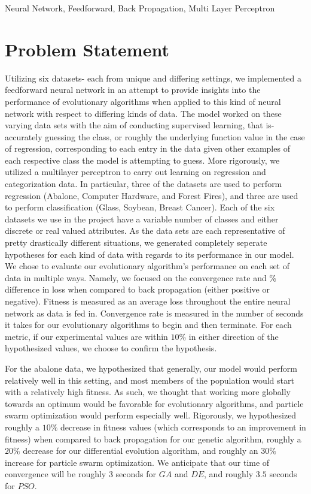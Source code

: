 \documentclass[twoside,11pt]{article}
\begin{document}
\begin{keywords}
	Neural Network, Feedforward, Back Propagation, Multi Layer Perceptron
\end{keywords}

\section{Problem Statement}
Utilizing six datasets- each from unique and differing settings, we implemented a feedforward neural network in an attempt to provide insights 
into the performance of evolutionary algorithms when applied to this kind of neural network with respect to differing kinds of data. 
The model worked on these varying data sets with the aim
of conducting supervised learning, that is- accurately guessing the class, or roughly the underlying function value in the case of regression, 
corresponding to each entry in the data given other examples of each respective
class the model is attempting to guess. More rigorously, we utilized a multilayer perceptron 
to carry out learning on regression and categorization data. In particular, three of the datasets are used to perform regression 
(Abalone, Computer Hardware, and Forest Fires),
  and three are used to perform classification (Glass, Soybean, Breast Cancer). Each of the six datasets we use in the project have a variable 
  number of classes and either discrete or real valued attributes. As the data sets are each representative of pretty drastically different situations,
  we generated completely seperate hypotheses for each kind of data with regards to its performance in our model. We chose to evaluate our evolutionary algorithm's
  performance on each set of data in multiple ways. Namely, we focused on the convergence rate and \% difference in loss when compared to back propagation 
  (either positive or negative). 
  Fitness is measured as an average loss throughout the entire neural network as data is fed in. Convergence rate is measured in the number
  of seconds it takes for our evolutionary algorithms to begin and then terminate. For each metric, if our experimental values are within $10\%$ in either direction of the
  hypothesized values, we choose to confirm the hypothesis.
  
  For the abalone data, we hypothesized that
  generally, our model would perform relatively well in this setting, and most members of the population would start with a relatively high fitness.
  As such, we thought that working more globally towards an optimum would be favorable for evolutionary algorithms, and particle swarm optimization
  would perform especially well. Rigorously, we hypothesized roughly a $10\%$ decrease in fitness values (which corresponds to an improvement in fitness)
  when compared to back propagation for our genetic algorithm, roughly a $20\%$
  decrease for our differential evolution algorithm, and roughly an $30\%$ increase for particle swarm optimization. We anticipate that our time of convergence
  will be roughly 3 seconds for $GA$ and $DE$, and roughly $3.5$ seconds for $PSO$.
\end{document}
